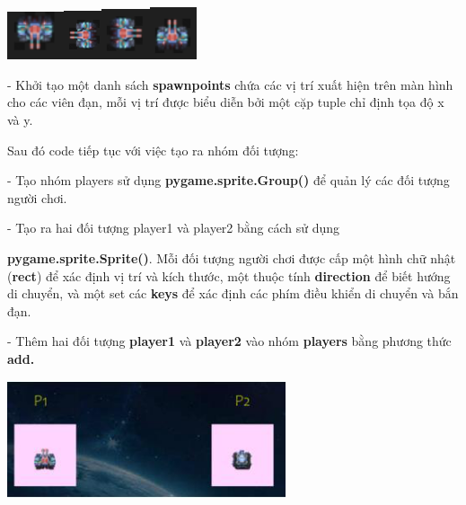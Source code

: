 \documentclass[a4paper]{article}
\begin{document}
\includegraphics[width=0.65417in,height=0.55972in]{image36.png}\includegraphics[width=0.43889in,height=0.5625in]{image37.png}\includegraphics[width=0.55833in,height=0.58333in]{image38.png}\includegraphics[width=0.54722in,height=0.60694in]{image39.png}

- Khởi tạo một danh sách \textbf{spawnpoints} chứa các vị trí xuất hiện
trên màn hình cho các viên đạn, mỗi vị trí được biểu diễn bởi một cặp
tuple chỉ định tọa độ x và y.

Sau đó code tiếp tục với việc tạo ra nhóm đối tượng:

- Tạo nhóm players sử dụng \textbf{pygame.sprite.Group()} để quản lý các
đối tượng người chơi.

- Tạo ra hai đối tượng player1 và player2 bằng cách sử dụng

\textbf{pygame.sprite.Sprite()}. Mỗi đối tượng người chơi được cấp một
hình chữ nhật (\textbf{rect}) để xác định vị trí và kích thước, một
thuộc tính \textbf{direction} để biết hướng di chuyển, và một set các
\textbf{keys} để xác định các phím điều khiển di chuyển và bắn đạn.

- Thêm hai đối tượng \textbf{player1} và \textbf{player2} vào nhóm
\textbf{players} bằng phương thức \textbf{add.}

\includegraphics[width=3.22639in,height=1.35694in]{image40.png}
\end{document}

